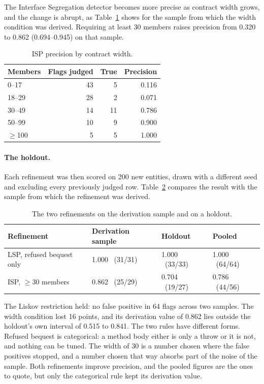 The Interface Segregation detector becomes more precise as contract width grows, and the change is
abrupt, as Table~\ref{tab:isp-width} shows for the sample from which the width condition was derived.
Requiring at least 30 members raises precision from 0.320 to 0.862 (0.694--0.945) on that sample.

\begin{table}[htb]
\centering
\caption{ISP precision by contract width.}
\label{tab:isp-width}
\begin{tabular}{@{}lrrr@{}}
\toprule
\textbf{Members} & \textbf{Flags judged} & \textbf{True} & \textbf{Precision} \\
\midrule
0--17    & 43 &  5 & 0.116 \\
18--29   & 28 &  2 & 0.071 \\
30--49   & 14 & 11 & 0.786 \\
50--99   & 10 &  9 & 0.900 \\
$\geq$100 &  5 &  5 & 1.000 \\
\bottomrule
\end{tabular}
\end{table}

\paragraph{The holdout.} Each refinement was then scored on 200 new entities, drawn with a different
seed and excluding every previously judged row. Table~\ref{tab:holdout} compares the result with the
sample from which the refinement was derived.

\begin{table}[htb]
\centering
\caption{The two refinements on the derivation sample and on a holdout.}
\label{tab:holdout}
\begin{tabular}{@{}llll@{}}
\toprule
\textbf{Refinement} & \textbf{Derivation sample} & \textbf{Holdout} & \textbf{Pooled} \\
\midrule
LSP, refused bequest only & 1.000 \ (31/31) & 1.000 \ (33/33) & 1.000 \ (64/64) \\
ISP, $\geq$30 members & 0.862 \ (25/29) & 0.704 \ (19/27) & 0.786 \ (44/56) \\
\bottomrule
\end{tabular}
\end{table}

The Liskov restriction held: no false positive in 64 flags across two samples. The width condition
lost 16 points, and its derivation value of 0.862 lies outside the holdout's own interval of 0.515 to
0.841. The two rules have different forms. Refused bequest is categorical: a method body either is
only a throw or it is not, and nothing can be tuned. The width of 30 is a number chosen where the
false positives stopped, and a number chosen that way absorbs part of the noise of the sample. Both
refinements improve precision, and the pooled figures are the ones to quote, but only the categorical
rule kept its derivation value.

